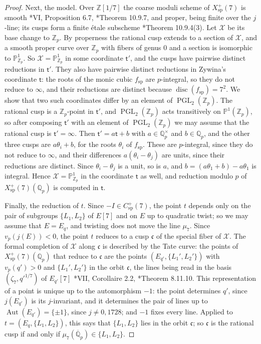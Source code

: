 \documentclass[12pt]{amsart}
\renewcommand{\P}{\mathbb{P}}
\newcommand{\Q}{\mathbb{Q}}
\newcommand{\Z}{\mathbb{Z}}
\newcommand{\Qbar}{{\overline{\Q}}}
\newcommand{\Pone}{\P^{1}}
\renewcommand{\t}{\mathsf{t}}
\DeclareMathOperator{\spc}{sp}
\DeclareMathOperator{\Aut}{Aut}
\DeclareMathOperator{\disc}{disc}
\newcommand{\PGL}{\operatorname{PGL}}
\numberwithin{equation}{section}
\theoremstyle{definition}
\begin{document}
\begin{proof}
  Next, the model. Over $\Z[1/7]$ the coarse moduli scheme of
  $X_{\spc}^{+}(7)$ is smooth \cite{DR-73}*{VI, Proposition 6.7},
  \cite{KM-85}*{Theorem 10.9.7}, and proper, being finite over the $j$-line;
  its cusps form a finite \'etale subscheme \cite{KM-85}*{Theorem 10.9.4(3)}.
  Let $\mathcal{X}$ be its base change to $\Z_p$. By properness the rational
  cusp extends to a section of $\mathcal{X}$, and a smooth proper curve over
  $\Z_p$ with fibers of genus $0$ and a section is isomorphic to
  $\Pone_{\Z_p}$. So $\mathcal{X} = \Pone_{\Z_p}$ in some coordinate $\t'$, and
  the cusps have pairwise distinct reductions in $\t'$. They also have pairwise
  distinct reductions in Zywina's coordinate $\t$: the roots of the monic cubic
  $f_{\spc}$ are $p$-integral, so they do not reduce to $\infty$, and their
  reductions are distinct because $\disc(f_{\spc}) = 7^2$. We show that two
  such coordinates differ by an element of $\PGL_2(\Z_p)$. The rational cusp is
  a $\Z_p$-point in $\t'$, and $\PGL_2(\Z_p)$ acts transitively on
  $\Pone(\Z_p)$, so after composing $\t'$ with an element of $\PGL_2(\Z_p)$ we
  may assume that the rational cusp is $\t' = \infty$. Then $\t' = a\t + b$
  with $a \in \Q_p^{\times}$ and $b \in \Q_p$, and the other three cusps are
  $a\theta_i + b$, for the roots $\theta_i$ of $f_{\spc}$. These are
  $p$-integral, since they do not reduce to $\infty$, and their differences
  $a(\theta_i - \theta_j)$ are units, since their reductions are distinct. Since
  $\theta_i - \theta_j$ is a unit, so is $a$, and $b = (a\theta_1 + b) -
  a\theta_1$ is integral. Hence $\mathcal{X} = \Pone_{\Z_p}$ in the coordinate
  $\t$ as well, and reduction modulo $p$ of $X_{\spc}^{+}(7)(\Q_p)$ is
  computed in $\t$.

  Finally, the reduction of $t$. Since $-I \in C_{\spc}^{+}(7)$, the point $t$
  depends only on the pair of subgroups $\{L_1,L_2\}$ of $E[7]$ and on $E$ up
  to quadratic twist; so we may assume that $E = E_q$, and twisting does not
  move the line $\mu_7$. Since $v_p(j(E)) < 0$, the point $t$ reduces to a cusp
  $\mathfrak{c}$ of the special fiber of $\mathcal{X}$. The formal completion of
  $\mathcal{X}$ along $\mathfrak{c}$ is described by the Tate curve: the points
  of $X_{\spc}^{+}(7)(\Q_p)$ that reduce to $\mathfrak{c}$ are the points
  $(E_{q'},\{L_1',L_2'\})$ with $v_p(q') > 0$ and $\{L_1',L_2'\}$ in the orbit
  $\mathfrak{c}$, the lines being read in the basis $(\zeta_7, q'^{1/7})$ of
  $E_{q'}[7]$ \cite{DR-73}*{VII, Corollaire 2.2}, \cite{KM-85}*{Theorem
    8.11.10}. This representation of a point is unique up to the automorphism
  $-1$: the point determines $q'$, since $j(E_{q'})$ is its $j$-invariant, and it
  determines the pair of lines up to $\Aut(E_{q'}) = \{\pm 1\}$, since $j \neq 0,
  1728$; and $-1$ fixes every line. Applied to $t = (E_q, \{L_1,L_2\})$, this
  says that $\{L_1,L_2\}$ lies in the orbit $\mathfrak{c}$; so $\mathfrak{c}$ is
  the rational cusp if and only if $\mu_7(\Qbar_p) \in \{L_1,L_2\}$.
\end{proof}
\end{document}
